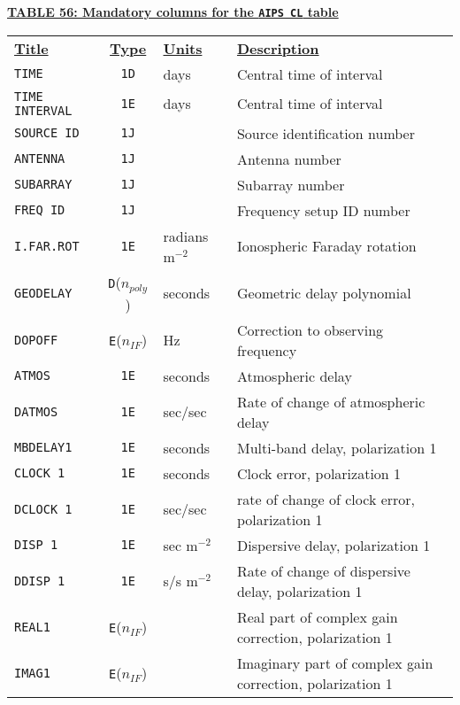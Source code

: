 \documentclass[twoside]{article}
\newcommand{\nif}{$n_{IF}$}
\newcommand{\npoly}{$n_{poly}$}
\begin{document}
\begin{center}
\underline{\bf{TABLE 56: Mandatory columns for the {\tt AIPS CL} table}}\\
\begin{tabular}{lcll}
\noalign{\vspace{2pt}} \label{ta:CLcols}
\underline{{\bf Title\vphantom{y}}} & \underline{\bf{Type}} &
   \underline{{\bf Units\vphantom{y}}} & \underline{\bf{Description}} \\
\noalign{\vspace{2pt}}
{\tt TIME}          & {\tt 1D} & days & Central time of interval \\
{\tt TIME INTERVAL} & {\tt 1E} & days & Central time of interval \\
{\tt SOURCE ID}     & {\tt 1J} &      & Source identification number \\
{\tt ANTENNA}       & {\tt 1J} &      & Antenna number \\
{\tt SUBARRAY}      & {\tt 1J} &      & Subarray number \\
{\tt FREQ ID}       & {\tt 1J} &      & Frequency setup ID number \\
{\tt I.FAR.ROT}     & {\tt 1E} & radians m$^{-2}$ & Ionospheric Faraday rotation \\
{\tt GEODELAY}      & {\tt D}(\npoly) & seconds & Geometric delay polynomial \\
{\tt DOPOFF}        & {\tt E}(\nif)   & Hz & Correction to observing frequency \\
{\tt ATMOS}         & {\tt 1E} & seconds & Atmospheric delay \\
{\tt DATMOS}        & {\tt 1E} & sec/sec & Rate of change of atmospheric delay \\
{\tt MBDELAY1}      & {\tt 1E} & seconds & Multi-band delay, polarization 1 \\
{\tt CLOCK 1}       & {\tt 1E} & seconds & Clock error, polarization 1 \\
{\tt DCLOCK 1}      & {\tt 1E} & sec/sec & rate of change of clock error, polarization 1 \\
{\tt DISP 1}        & {\tt 1E} & sec m$^{-2}$ & Dispersive delay, polarization 1 \\
{\tt DDISP 1}       & {\tt 1E} & s/s m$^{-2}$ & Rate of change of dispersive delay, polarization 1 \\
{\tt REAL1}         & {\tt E}(\nif) & & Real part of complex gain correction, polarization 1 \\
{\tt IMAG1}         & {\tt E}(\nif) & & Imaginary part of complex gain correction, polarization 1 \\

\end{tabular}
\end{center}
\end{document}
